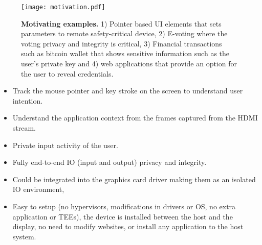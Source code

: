 \begin{figure}[t]
\centering
\texttt{[image: motivation.pdf]}
\caption{\textbf{Motivating examples.} 1) Pointer based UI elements that sets parameters to remote safety-critical device, 2) E-voting where the voting privacy and integrity is critical, 3) Financial transactions such as bitcoin wallet that shows sensitive information such as the user's private key and 4) web applications that provide an option for the user to reveal credentials.}
\label{fig:motivation}
\centering
\end{figure}

\begin{itemize}
  \item Track the mouse pointer and key stroke on the screen to understand user intention.
  \item Understand the application context from the frames captured from the HDMI stream.
  \item Private input activity of the user.
  \item Fully end-to-end IO (input and output) privacy and integrity.
  \item Could be integrated into the graphics card driver making them as an isolated IO environment,
  \item Easy to setup (no hypervisors, modifications in drivers or OS, no extra application or TEEs), the device is installed between the host and the display, no need to modify websites, or install any application to the host system.
\end{itemize}